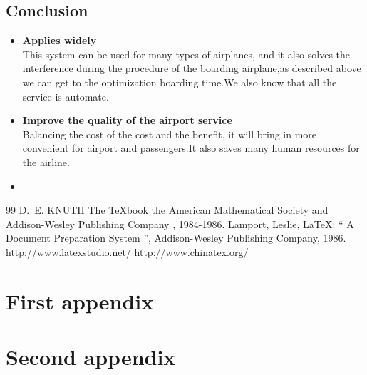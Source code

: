 \documentclass{mcmthesis}
\begin{document}
\subsection{Conclusion}
\begin{itemize}
\item \textbf{Applies widely}\\
This  system can be used for many types of airplanes, and it also
solves the interference during  the procedure of the boarding
airplane,as described above we can get to the  optimization\cite{2}
boarding time.We also know that all the service is automate.
\item \textbf{Improve the quality of the airport service}\\
Balancing the cost of the cost and the benefit, it will bring in
more convenient  for airport and passengers.It also saves many\cite{1}
human resources for the airline. \item \textbf{}
\end{itemize}

\begin{thebibliography}{99}
 D.~E. KNUTH   The \TeX{}book  the American
Mathematical Society and Addison-Wesley
Publishing Company , 1984-1986.
Lamport, Leslie,  \LaTeX{}: `` A Document Preparation System '',
Addison-Wesley Publishing Company, 1986.
\url{http://www.latexstudio.net/}
\url{http://www.chinatex.org/}
\end{thebibliography}

\begin{appendices}


\section{First appendix}

\section{Second appendix}


\end{appendices}
\end{document}
